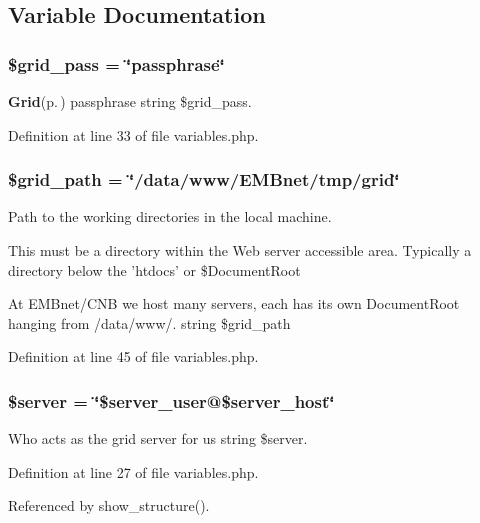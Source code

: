 \subsection{Variable Documentation}
\subsubsection{\setlength{\rightskip}{0pt plus 5cm}\$grid\_\-pass = \char`\"{}passphrase\char`\"{}}\label{variables_8php_a3}


{\bf Grid}{\rm (p.\,\pageref{classGrid})} passphrase  string \$grid\_\-pass. 



Definition at line 33 of file variables.php.
\subsubsection{\setlength{\rightskip}{0pt plus 5cm}\$grid\_\-path = \char`\"{}/data/www/EMBnet/tmp/grid\char`\"{}}\label{variables_8php_a4}


Path to the working directories in the local machine. 

This must be a directory within the Web server accessible area. Typically a directory below the 'htdocs' or \$Document\-Root

At EMBnet/CNB we host many servers, each has its own Document\-Root hanging from /data/www/.  string \$grid\_\-path 

Definition at line 45 of file variables.php.
\subsubsection{\setlength{\rightskip}{0pt plus 5cm}\$server = \char`\"{}\$server\_\-user@\$server\_\-host\char`\"{}}\label{variables_8php_a2}


Who acts as the grid server for us  string \$server. 



Definition at line 27 of file variables.php.

Referenced by show\_\-structure().
